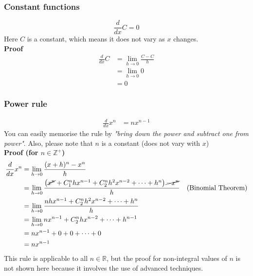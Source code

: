 \documentclass{article}
\begin{document}
\subsubsection{Constant functions}
\begin{equation*}
    \frac{d}{dx} C=0
\end{equation*}
Here $C$ is a constant, which means it
does not vary as $x$ changes.\\
\textbf{Proof}
\begin{equation*}
    \begin{aligned}
    \frac{d}{dx} C & =\lim _{h\rightarrow 0}\frac{C-C}{h}\\
     & =\lim _{h\rightarrow 0} 0\\
     & =0
    \end{aligned}
\end{equation*}
\subsubsection{Power rule}
\begin{equation*}
    \begin{aligned}
    \frac{d}{dx} x^{n} & =nx^{n-1}
\end{aligned}
\end{equation*}
You can easily memorise the rule by
\textit{"bring down the power and subtract one
from power"}. Also, please note that $n$ is
a constant (does not vary with $x$)\\
\textbf{Proof (for $n\in\mathbb{Z}^{+}$)}
\begin{equation*}
\begin{aligned}
    \frac{d}{dx} x^{n} & =\lim _{h\rightarrow 0}\frac{( x+h)^{n} -x^{n}}{h} & \\
     & =\lim _{h\rightarrow 0}\frac{\left(\cancel{x^{n}} +C_{1}^{n} hx^{n-1} +C_{2}^{n} h^{2} x^{n-2} +\cdots +h^{n}\right)\cancel{-x^{n}}}{h} & \text{(Binomial Theorem)}\\
     & =\lim _{h\rightarrow 0}\frac{nhx^{n-1} +C_{2}^{n} h^{2} x^{n-2} +\cdots +h^{n}}{h} & \\
     & =\lim _{h\rightarrow 0} nx^{n-1} +C_{2}^{n} hx^{n-2} +\cdots +h^{n-1} & \\
     & =nx^{n-1} +0+0+\cdots +0 & \\
     & =nx^{n-1} & 
\end{aligned}
\end{equation*}
This rule is applicable to all
$n\in\mathbb{R}$, but the proof for
non-integral values of $n$ is not shown
here because it involves the use of
advanced techniques.
\end{document}
